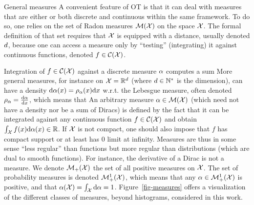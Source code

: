 \begin{rem2}{General measures}
A convenient feature of OT is that it can deal with measures that are either or both discrete and continuous within the same framework. To do so, one relies on the set of Radon measures $\mathcal{M}(\mathcal{X})$ on the space $\mathcal{X}$. The formal definition of that set
requires that $\mathcal{X}$ is equipped with a distance, usually denoted $d$, because one can access a measure only by ``testing'' (integrating) it against continuous functions, denoted $f \in \mathcal{C}(\mathcal{X})$.

Integration of $f \in \mathcal{C}(\mathcal{X})$ against a discrete measure $\alpha$ computes a sum
%
More general measures, for instance on $\mathcal{X}=\mathbb{R}^d$ (where $d \in \mathbb{N}^*$ is the dimension), can have a density $\mathrm{d}\alpha(x)=\rho_{\alpha}(x)\mathrm{d} x$ w.r.t. the Lebesgue measure, often denoted $\rho_{\alpha} = \frac{\mathrm{d}\alpha}{\mathrm{d} x}$, which means that
%
An arbitrary measure $\alpha \in \mathcal{M}(\mathcal{X})$ (which need not have a density nor be a sum of Diracs) is defined by the fact that it can be integrated against any continuous function $f \in \mathcal{C}(\mathcal{X})$ and obtain $\int_{\mathcal{X}} f(x) \mathrm{d}\alpha(x) \in \mathbb{R}$. If $\mathcal{X}$ is not compact, one should also impose that $f$ has compact support or at least has $0$ limit at infinity.
%
Measures are thus in some sense ``less regular'' than functions but more regular than distributions (which are dual to smooth functions). For instance, the derivative of a Dirac is not a measure.
%
We denote $\mathcal{M}_+(\mathcal{X})$ the set of all positive measures on $\mathcal{X}$. The set of probability measures is denoted $\mathcal{M}_+^1(\mathcal{X})$, which means that any $\alpha \in \mathcal{M}_+^1(\mathcal{X})$ is positive, and that $\alpha(\mathcal{X})=\int_{\mathcal{X}} \mathrm{d}\alpha = 1$.
%
Figure~\ref{fig-measures} offers a visualization of the different classes of measures, beyond histograms, considered in this work.
\end{rem2}


